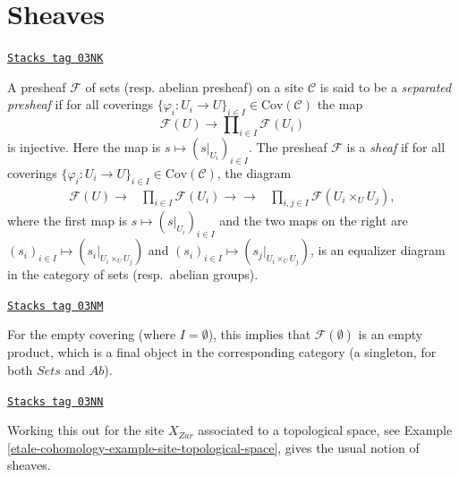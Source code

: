 \section{Sheaves}
\label{etale-cohomology-section-sheaves}
\begin{definition}[Sheaf]
\label{etale-cohomology-definition-sheaf}
\href{https://stacks.math.columbia.edu/tag/03NK}{\texttt{Stacks tag 03NK}}

A presheaf $\mathcal{F}$ of sets (resp. abelian presheaf) on a site
$\mathcal{C}$ is said to be a {\it separated presheaf} if for all coverings
$\{\varphi_i : U_i \to U\}_{i\in I} \in \text{Cov} (\mathcal{C})$
the map
$$
\mathcal{F}(U) \longrightarrow \prod\nolimits_{i\in I} \mathcal{F}(U_i)
$$
is injective. Here the map is $s \mapsto (s|_{U_i})_{i\in I}$.
The presheaf $\mathcal{F}$ is a {\it sheaf} if for all coverings
$\{\varphi_i : U_i \to U\}_{i\in I} \in \text{Cov} (\mathcal{C})$, the
diagram
\begin{equation}
\label{equation-sheaf-axiom}
\begin{array}{ccc}\mathcal{F}(U) \longrightarrow & \prod_{i\in I} \mathcal{F}(U_i) \longrightarrow\longrightarrow & \prod_{i, j \in I} \mathcal{F}(U_i \times_U U_j),\end{array}
\end{equation}
where the first map is $s \mapsto (s|_{U_i})_{i\in I}$ and the two
maps on the right are
$(s_i)_{i\in I} \mapsto (s_i |_{U_i \times_U U_j})$ and
$(s_i)_{i\in I} \mapsto (s_j |_{U_i \times_U U_j})$,
is an equalizer diagram in the category of sets (resp.\ abelian groups).
\end{definition}

\begin{remark}
\label{etale-cohomology-remark-empty-covering}
\href{https://stacks.math.columbia.edu/tag/03NM}{\texttt{Stacks tag 03NM}}

For the empty covering (where $I = \emptyset$), this implies that
$\mathcal{F}(\emptyset)$ is an empty product, which is a final object in the
corresponding category (a singleton, for both $\textit{Sets}$ and
$\textit{Ab}$).
\end{remark}

\begin{example}
\label{etale-cohomology-example-sheaf-site-space}
\href{https://stacks.math.columbia.edu/tag/03NN}{\texttt{Stacks tag 03NN}}

Working this out for the site $X_{Zar}$ associated to a topological
space, see Example \ref{etale-cohomology-example-site-topological-space}, gives the usual
notion of sheaves.
\end{example}

